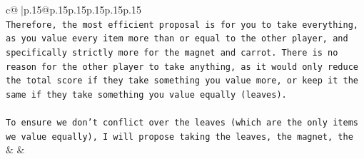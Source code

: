 \documentclass{article}
\begin{document}
{\begin{supertabular}{c@{$\;$}|p{.15\linewidth}@{}p{.15\linewidth}p{.15\linewidth}p{.15\linewidth}p{.15\linewidth}p{.15\linewidth}}
{{{\\ 
\texttt{Therefore, the most efficient proposal is for you to take everything, as you value every item more than or equal to the other player, and specifically strictly more for the magnet and carrot. There is no reason for the other player to take anything, as it would only reduce the total score if they take something you value more, or keep it the same if they take something you value equally (leaves).} \\
\\ 
\texttt{To ensure we don't conflict over the leaves (which are the only items we value equally), I will propose taking the leaves, the magnet, the} \\
            }
        }
    }
    & & \\ \\


\end{supertabular}}
\end{document}
